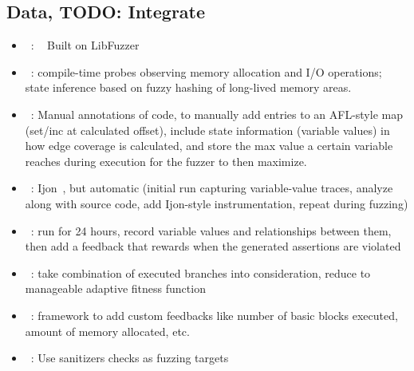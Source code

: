 \documentclass{article}
\let\savedCite=\cite
\renewcommand{\cite}{\unskip~\savedCite}
\begin{document}
\begin{multicols}{2}
  \subsection{Data, TODO: Integrate}
  \begin{itemize}
    \item {}\cite{StatefulGreybox}: \cite{StatefulGreybox} Built on LibFuzzer
    \item {}\cite{StateAFL}: compile-time probes observing memory allocation and I/O operations; state inference based on fuzzy hashing of long-lived memory areas.
    \item {}\cite{Ijon}: Manual annotations of code, to manually add entries to an AFL-style map (set/inc at calculated offset), include state information (variable values) in how edge coverage is calculated, and store the max value a certain variable reaches during execution for the fuzzer to then maximize.
    \item {}\cite{SandPuppy}: Ijon\cite{Ijon}, but automatic (initial run capturing variable-value traces, analyze along with source code, add Ijon-style instrumentation, repeat during fuzzing)
    \item {}\cite{INVSCOV}: run for 24 hours, record variable values and relationships between them, then add a feedback that rewards when the generated assertions are violated
    \item {}\cite{Ankou}: take combination of executed branches into consideration, reduce to manageable adaptive fitness function
    \item {}\cite{FuzzFactory}: framework to add custom feedbacks like number of basic blocks executed, amount of memory allocated, etc.
    \item {}\cite{ParmeSan}: Use sanitizers checks as fuzzing targets

\end{itemize}
\end{multicols}
\end{document}
